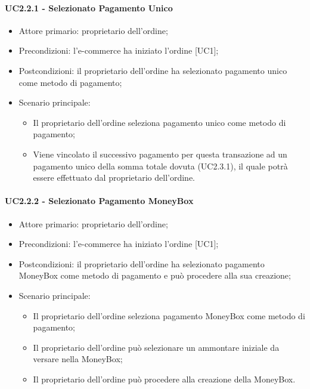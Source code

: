\paragraph{UC2.2.1 - Selezionato Pagamento Unico}\label{sssec: UC2.2.1}

\begin{itemize}
    \item Attore primario: proprietario dell'ordine;
    \item Precondizioni: l'e-commerce\glo{} ha iniziato l'ordine [UC1];
    \item Postcondizioni: il proprietario dell'ordine ha selezionato pagamento unico come metodo di pagamento;
    \item Scenario principale: 
        \begin{itemize}
            \item Il proprietario dell'ordine seleziona pagamento unico come metodo di pagamento;
            \item Viene vincolato il successivo pagamento per questa transazione ad un pagamento unico della somma totale dovuta (UC2.3.1), il quale potrà essere effettuato dal proprietario dell'ordine.
        \end{itemize}
\end{itemize}

\paragraph{UC2.2.2 - Selezionato Pagamento MoneyBox}

\begin{itemize}
    \item Attore primario: proprietario dell'ordine;
    \item Precondizioni: l'e-commerce\glo{} ha iniziato l'ordine [UC1];
    \item Postcondizioni: il proprietario dell'ordine ha selezionato pagamento MoneyBox\glo{} come metodo di pagamento e può procedere alla sua creazione;
    \item Scenario principale: 
        \begin{itemize}
            \item Il proprietario dell'ordine seleziona pagamento MoneyBox\glo{} come metodo di pagamento;
            \item Il proprietario dell'ordine può selezionare un ammontare iniziale da versare nella MoneyBox\glo{};
            \item Il proprietario dell'ordine può procedere alla creazione della MoneyBox\glo{}.
        \end{itemize}
\end{itemize}

